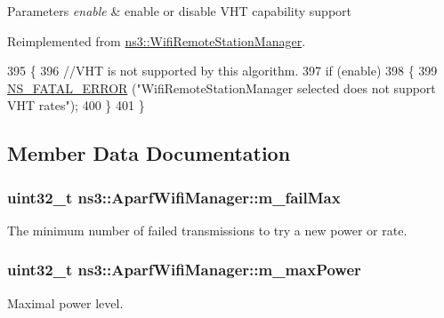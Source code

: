 \begin{DoxyParams}{Parameters}
{\em enable} & enable or disable V\+HT capability support \\
\hline
\end{DoxyParams}


Reimplemented from \hyperlink{classns3_1_1WifiRemoteStationManager_a149cf907f831f80e22162624a01f6c1a}{ns3\+::\+Wifi\+Remote\+Station\+Manager}.


\begin{DoxyCode}
395 \{
396   \textcolor{comment}{//VHT is not supported by this algorithm.}
397   \textcolor{keywordflow}{if} (enable)
398     \{
399       \hyperlink{group__fatal_ga5131d5e3f75d7d4cbfd706ac456fdc85}{NS\_FATAL\_ERROR} (\textcolor{stringliteral}{"WifiRemoteStationManager selected does not support VHT rates"});
400     \}
401 \}
\end{DoxyCode}


\subsection{Member Data Documentation}
\subsubsection[{\texorpdfstring{m\+\_\+fail\+Max}{m_failMax}}]{\setlength{\rightskip}{0pt plus 5cm}uint32\+\_\+t ns3\+::\+Aparf\+Wifi\+Manager\+::m\+\_\+fail\+Max\hspace{0.3cm}{\ttfamily [private]}}\hypertarget{classns3_1_1AparfWifiManager_a1619f19b03ae5c4fc5f9032a71380f3e}{}\label{classns3_1_1AparfWifiManager_a1619f19b03ae5c4fc5f9032a71380f3e}


The minimum number of failed transmissions to try a new power or rate. 

\subsubsection[{\texorpdfstring{m\+\_\+max\+Power}{m_maxPower}}]{\setlength{\rightskip}{0pt plus 5cm}uint32\+\_\+t ns3\+::\+Aparf\+Wifi\+Manager\+::m\+\_\+max\+Power\hspace{0.3cm}{\ttfamily [private]}}\hypertarget{classns3_1_1AparfWifiManager_a732bf09011390e3a9ca7f703d847215e}{}\label{classns3_1_1AparfWifiManager_a732bf09011390e3a9ca7f703d847215e}
Maximal power level. 
